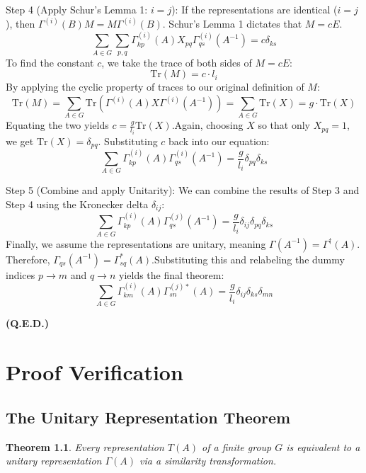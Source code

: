 \documentclass[11pt, a4paper]{report}
\newtheorem{theorem}{Theorem}
\begin{document}
Step 4 (Apply Schur’s Lemma 1: $i = j$):
If the representations are identical ($i = j$), then $\Gamma^{(i)}(B) M = M \Gamma^{(i)}(B)$. Schur’s Lemma 1 dictates that $M = cE$.
\[
\sum_{A \in G} \sum_{p,q} \Gamma^{(i)}_{kp}(A) X_{pq} \Gamma^{(i)}_{qs}(A^{-1}) = c \delta_{ks}
\]
To find the constant $c$, we take the trace of both sides of $M = cE$:
\[
\text{Tr}(M) = c \cdot l_i
\]
By applying the cyclic property of traces to our original definition of $M$:
\[
\text{Tr}(M) = \sum_{A \in G} \text{Tr}\left(\Gamma^{(i)}(A) X \Gamma^{(i)}(A^{-1})\right) = \sum_{A \in G} \text{Tr}(X) = g \cdot \text{Tr}(X)
\]
Equating the two yields $c = \frac{g}{l_i} \text{Tr}(X)$.Again, choosing $X$ so that only $X_{pq} = 1$, we get $\text{Tr}(X) = \delta_{pq}$. Substituting $c$ back into our equation:
\[
\sum_{A \in G} \Gamma^{(i)}_{kp}(A) \Gamma^{(i)}_{qs}(A^{-1}) = \frac{g}{l_i} \delta_{pq} \delta_{ks}
\]

Step 5 (Combine and apply Unitarity):
We can combine the results of Step 3 and Step 4 using the Kronecker delta $\delta_{ij}$:
\[
\sum_{A \in G} \Gamma^{(i)}_{kp}(A) \Gamma^{(j)}_{qs}(A^{-1}) = \frac{g}{l_i} \delta_{ij} \delta_{pq} \delta_{ks}
\]
Finally, we assume the representations are unitary, meaning $\Gamma(A^{-1}) = \Gamma^\dagger(A)$. Therefore, $\Gamma_{qs}(A^{-1}) = \Gamma^*_{sq}(A)$.Substituting this and relabeling the dummy indices $p \to m$ and $q \to n$ yields the final theorem:
\[
\sum_{A \in G} \Gamma^{(i)}_{km}(A) \Gamma^{(j)*}_{sn}(A) = \frac{g}{l_i} \delta_{ij} \delta_{ks} \delta_{mn}
\]

\textbf{(Q.E.D.)}



\chapter{Proof Verification}

\section{The Unitary Representation Theorem}

\begin{theorem}
Every representation $T(A)$ of a finite group $G$ is equivalent to a unitary representation $\Gamma(A)$ via a similarity transformation.
\end{theorem}
\end{document}
